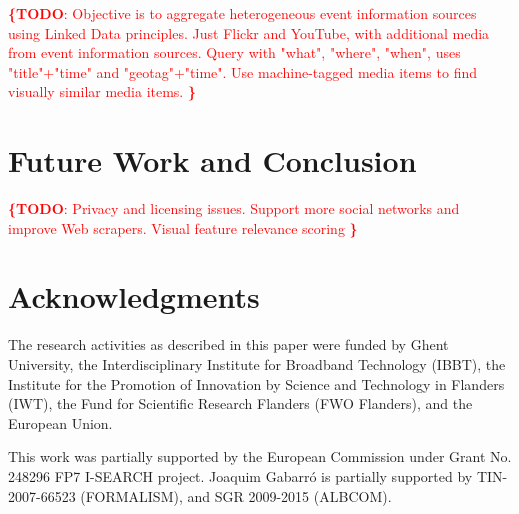 \documentclass{acm_proc_article-sp}
\newcommand{\todo}[1]{\noindent\textcolor{red}{{\bf \{TODO}: #1{\bf \}}}}
\newcommand{\inlinelistingsize}{\fontsize{8pt}{11pt}}
\let\oldttdefault\ttdefault
\renewcommand{\ttdefault}{pcr}
\let\oldurl\url
\renewcommand{\url}[1]{\inlinelistingsize\oldurl{#1}}
\begin{document}
\todo{
\cite{Liu2011}
Objective is to aggregate heterogeneous event information sources using Linked Data principles.
Just Flickr and YouTube, with additional media from event information sources.
Query with "what", "where", "when", uses "title"+"time" and "geotag"+"time".
Use machine-tagged media items to find visually similar media items.
}

\section{Future Work and Conclusion}
\todo{
Privacy and licensing issues.
Support more social networks and improve Web scrapers.
Visual feature relevance scoring
}

\section*{Acknowledgments}
The research activities as described in this paper were funded by Ghent University, the Interdisciplinary Institute for Broadband Technology (IBBT), the Institute for the Promotion of Innovation by Science and Technology in Flanders (IWT), the Fund for Scientific Research Flanders (FWO Flanders), and the European Union.

This work was partially supported by the European Commission under Grant No. 248296 FP7 \mbox{I-SEARCH} project.
Joaquim Gabarr\'o is partially supported by TIN-2007-66523 (FORMALISM), and SGR 2009-2015 (\mbox{ALBCOM}).

\let\ttdefault\oldttdefault
\let\url\oldurl




\balancecolumns
\end{document}
